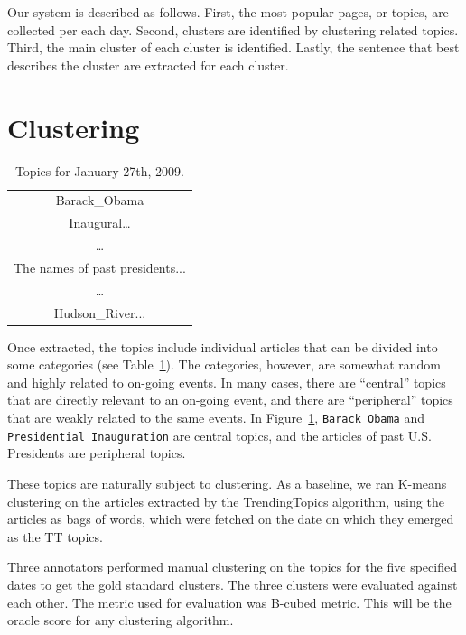 \documentclass[11pt]{article}
\begin{document}

Our system is described as follows. First, the most popular pages, or topics, are collected per each day. Second, clusters are identified by clustering related topics. Third, the main cluster of each cluster is identified. Lastly, the sentence that best describes the cluster are extracted for each cluster.

\section{Clustering}
\label{ssec:clustering}

\begin{table}
\begin{tabular}{|c|}
\hline
Barack\_Obama \\
Inaugural\dots \\
\dots \\
The names of past presidents...\\
\dots \\
Hudson\_River... \\
\hline
\end{tabular}
\caption{Topics for January 27th, 2009.}
\label{tab:topics-example}
\end{table}

Once extracted, the topics include individual articles that can be divided into some categories (see Table~\ref{tab:topics-example}). The categories, however, are somewhat random and highly related to on-going events. In many cases, there are ``central'' topics that are directly relevant to an on-going event, and there are ``peripheral'' topics that are weakly related to the same events. In Figure~\ref{tab:topics-example}, \verb'Barack Obama' and \verb'Presidential Inauguration' are central topics, and the articles of past U.S. Presidents are peripheral topics.

These topics are naturally subject to clustering. As a baseline, we ran K-means clustering on the articles extracted by the TrendingTopics algorithm, using the articles as bags of words, which were fetched on the date on which they emerged as the TT topics.

Three annotators performed manual clustering on the topics for the five specified dates to get the gold standard clusters. The three clusters were evaluated against each other. The metric used for evaluation was B-cubed metric. This will be the oracle score for any clustering algorithm.
\end{document}
